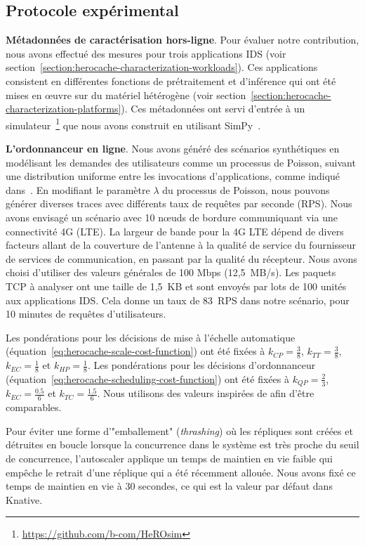 \subsection{Protocole expérimental}

\textbf{Métadonnées de caractérisation hors-ligne}. Pour évaluer notre contribution, nous avons effectué des mesures pour trois applications IDS (voir section~\ref{section:herocache-characterization-workloads}). Ces applications consistent en différentes fonctions de prétraitement et d'inférence qui ont été mises en œuvre sur du matériel hétérogène (voir section~\ref{section:herocache-characterization-platforms}). Ces métadonnées ont servi d'entrée à un simulateur~\footnote{\href{https://github.com/b-com/HeROsim}{https://github.com/b-com/HeROsim}} que nous avons construit en utilisant SimPy~\cite{simpy}.

\textbf{L'ordonnanceur en ligne}. Nous avons généré des scénarios synthétiques en modélisant les demandes des utilisateurs comme un processus de Poisson, suivant une distribution uniforme entre les invocations d'applications, comme indiqué dans~\cite{9928755}. En modifiant le paramètre $\lambda$ du processus de Poisson, nous pouvons générer diverses traces avec différents taux de requêtes par seconde (RPS). Nous avons envisagé un scénario avec 10 nœuds de bordure communiquant via une connectivité 4G (LTE). La largeur de bande pour la 4G LTE dépend de divers facteurs allant de la couverture de l'antenne à la qualité de service du fournisseur de services de communication, en passant par la qualité du récepteur. Nous avons choisi d'utiliser des valeurs générales de 100 Mbps (12,5~MB/s). Les paquets TCP à analyser ont une taille de 1,5~KB et sont envoyés par lots de 100 unités aux applications IDS. Cela donne un taux de 83~RPS dans notre scénario, pour 10 minutes de requêtes d'utilisateurs. 

Les pondérations pour les décisions de mise à l'échelle automatique (équation~\ref{eq:herocache-scale-cost-function}) ont été fixées à $k_{CP} = \frac{3}{8}$, $k_{TT} = \frac{3}{8}$, $k_{EC} = \frac{1}{8}$ et $k_{HP} = \frac{1}{8}$. Les pondérations pour les décisions d'ordonnanceur (équation~\ref{eq:herocache-scheduling-cost-function}) ont été fixées à $k_{QP} = \frac{2}{3}$, $k_{EC} = \frac{0.5}{6}$ et $k_{TC} = \frac{1.5}{6}$. Nous utilisons des valeurs inspirées de \cite{herofake} afin d'être comparables.

Pour éviter une forme d'"emballement" (\textit{thrashing}) où les répliques sont créées et détruites en boucle lorsque la concurrence dans le système est très proche du seuil de concurrence, l'autoscaler applique un temps de maintien en vie faible qui empêche le retrait d'une réplique qui a été récemment allouée. Nous avons fixé ce temps de maintien en vie à 30 secondes, ce qui est la valeur par défaut dans Knative.

